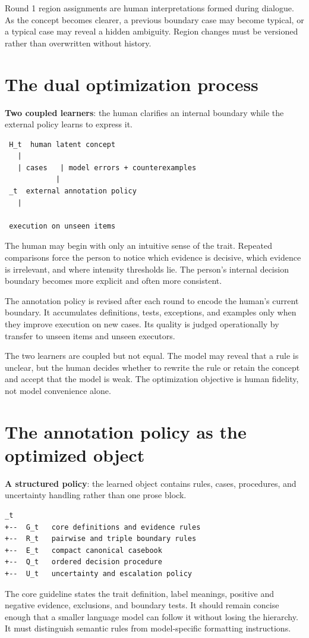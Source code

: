 Round 1 region assignments are human interpretations formed during dialogue. As the concept becomes clearer, a previous boundary case may become typical, or a typical case may reveal a hidden ambiguity. Region changes must be versioned rather than overwritten without history.


\section{The dual optimization process}
\textbf{Two coupled learners}: the human clarifies an internal boundary while the external policy learns to express it.

\begin{verbatim}
 H_t  human latent concept
   |
   | cases   | model errors + counterexamples
            |
 _t  external annotation policy
   |

 execution on unseen items
\end{verbatim}
The human may begin with only an intuitive sense of the trait. Repeated comparisons force the person to notice which evidence is decisive, which evidence is irrelevant, and where intensity thresholds lie. The person's internal decision boundary becomes more explicit and often more consistent.

The annotation policy is revised after each round to encode the human's current boundary. It accumulates definitions, tests, exceptions, and examples only when they improve execution on new cases. Its quality is judged operationally by transfer to unseen items and unseen executors.

The two learners are coupled but not equal. The model may reveal that a rule is unclear, but the human decides whether to rewrite the rule or retain the concept and accept that the model is weak. The optimization objective is human fidelity, not model convenience alone.


\section{The annotation policy as the optimized object}
\textbf{A structured policy}: the learned object contains rules, cases, procedures, and uncertainty handling rather than one prose block.

\begin{verbatim}
_t
+--  G_t   core definitions and evidence rules
+--  R_t   pairwise and triple boundary rules
+--  E_t   compact canonical casebook
+--  Q_t   ordered decision procedure
+--  U_t   uncertainty and escalation policy
\end{verbatim}
The core guideline states the trait definition, label meanings, positive and negative evidence, exclusions, and boundary tests. It should remain concise enough that a smaller language model can follow it without losing the hierarchy. It must distinguish semantic rules from model-specific formatting instructions.

